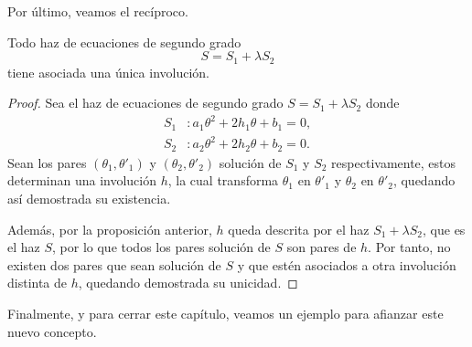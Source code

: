 Por último, veamos el recíproco.
\begin{prop}
	Todo haz de ecuaciones de segundo grado
	\begin{equation*}
		S=S_1+\lambda S_2
	\end{equation*}
	tiene asociada una única involución.
\end{prop}
\begin{proof}
	Sea el haz de ecuaciones de segundo grado $S=S_1+\lambda S_2$ donde
	\begin{equation*}
	\begin{split}
		S_1&:a_1\theta^2+2h_1\theta+b_1=0,\\
		S_2&:a_2\theta^2+2h_2\theta+b_2=0.
	\end{split}
	\end{equation*}
	Sean los pares $(\theta_1,\theta'_1)$ y $(\theta_2,\theta'_2)$ solución de $S_1$ y $S_2$ respectivamente, estos determinan una involución $h$, la cual transforma $\theta_1$ en $\theta'_1$ y $\theta_2$ en $\theta'_2$, quedando así demostrada su existencia.
	
	Además, por la proposición anterior, $h$ queda descrita por el haz $S_1+\lambda S_2$, que es el haz $S$, por lo que todos los pares solución de $S$ son pares de $h$. Por tanto, no existen dos pares que sean solución de $S$ y que estén asociados a otra involución distinta de $h$, quedando demostrada su unicidad.
\end{proof}
Finalmente, y para cerrar este capítulo, veamos un ejemplo para afianzar este nuevo concepto.
